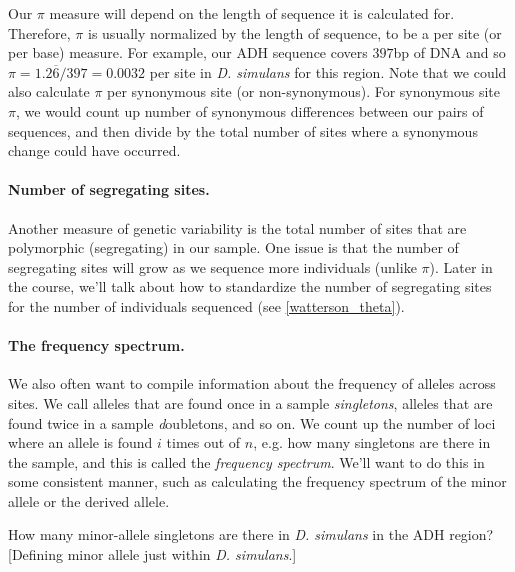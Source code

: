 Our $\pi$ measure will depend on the length of sequence it is calculated
for. Therefore, $\pi$ is usually normalized by the length of sequence,
to be a per site (or per base) measure. For example, our ADH sequence covers $397$bp of DNA and so $\pi = 1.2\overline{6}/397=0.0032$ per site in \textit{D. simulans} for this region. Note that we could also calculate $\pi$ per synonymous site (or non-synonymous). For synonymous site $\pi$, we would count up number of synonymous differences between our pairs of sequences, and then divide by the total number of sites where a synonymous change could have occurred.{


\paragraph{Number of segregating sites.} Another measure of genetic variability is the total number of sites
that are polymorphic (segregating) in our sample. One issue is that
the number of segregating sites will grow as we sequence more
individuals (unlike $\pi$). Later in the course, we'll talk about how to standardize the
number of segregating sites for the number of individuals sequenced (see \eqn \eqref{watterson_theta}).

\paragraph{The frequency spectrum.}
We also often want to compile information about the frequency of
alleles across sites.  We call alleles that are found once in a sample
\emph{singletons}, alleles that are found twice in a sample {\emph
  doubletons}, and so on. We count up the number of loci where an
allele is found $i$ times out of $n$, e.g. how many singletons are
there in the sample, and this is called the \emph{frequency
  spectrum}. We'll want to do this in some consistent manner, such as calculating the frequency spectrum of the minor allele or the derived allele.

\begin{question}{}
How many minor-allele singletons are there in \textit{D. simulans} in
the ADH region? [Defining minor allele just within \textit{D. simulans}.]
 \end{question}
}
